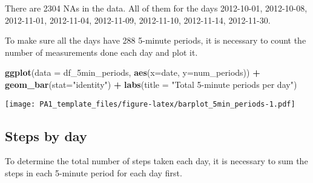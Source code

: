 \documentclass[
]{article}
\newenvironment{Shaded}{\begin{snugshade}}{\end{snugshade}}
\newcommand{\AttributeTok}[1]{\textcolor[rgb]{0.13,0.29,0.53}{#1}}
\newcommand{\FunctionTok}[1]{\textcolor[rgb]{0.13,0.29,0.53}{\textbf{#1}}}
\newcommand{\NormalTok}[1]{#1}
\newcommand{\OtherTok}[1]{\textcolor[rgb]{0.56,0.35,0.01}{#1}}
\newcommand{\SpecialCharTok}[1]{\textcolor[rgb]{0.81,0.36,0.00}{\textbf{#1}}}
\newcommand{\StringTok}[1]{\textcolor[rgb]{0.31,0.60,0.02}{#1}}
\begin{document}
There are 2304 NAs in the data. All of them for the days 2012-10-01,
2012-10-08, 2012-11-01, 2012-11-04, 2012-11-09, 2012-11-10, 2012-11-14,
2012-11-30.

To make sure all the days have 288 5-minute periods, it is necessary to
count the number of measurements done each day and plot it.

\begin{Shaded}
\end{Shaded}

\begin{Shaded}
\begin{Highlighting}[]
\FunctionTok{ggplot}\NormalTok{(}\AttributeTok{data =}\NormalTok{ df\_5min\_periods, }\FunctionTok{aes}\NormalTok{(}\AttributeTok{x=}\NormalTok{date, }\AttributeTok{y=}\NormalTok{num\_periods)) }\SpecialCharTok{+}
  \FunctionTok{geom\_bar}\NormalTok{(}\AttributeTok{stat=}\StringTok{"identity"}\NormalTok{) }\SpecialCharTok{+}
  \FunctionTok{labs}\NormalTok{(}\AttributeTok{title =} \StringTok{"Total 5{-}minute periods per day"}\NormalTok{)}
\end{Highlighting}
\end{Shaded}

\texttt{[image: PA1\_template\_files/figure-latex/barplot\_5min\_periods-1.pdf]}

\hypertarget{steps-by-day}{%
\subsection{Steps by day}\label{steps-by-day}}

To determine the total number of steps taken each day, it is necessary
to sum the steps in each 5-minute period for each day first.

\begin{Shaded}
\end{Shaded}
\end{document}
